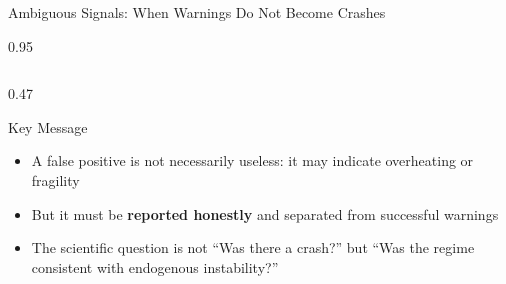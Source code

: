 \documentclass[9pt, aspectratio=169, t]{beamer}
\begin{document}
\begin{frame}{Ambiguous Signals: When Warnings Do Not Become Crashes}
\begin{cminipage}{0.95\textwidth}
{\begin{columns}[T]
\begin{column}{0.47\textwidth}
\begin{exampleblock}{Key Message}
                \begin{itemize}\setlength{\itemsep}{0pt}
                    \item A false positive is not necessarily useless: it may indicate overheating or fragility
                    \item But it must be \textbf{reported honestly} and separated from successful warnings
                    \item The scientific question is not ``Was there a crash?'' but ``Was the regime consistent with endogenous instability?''
                \end{itemize}
            \end{exampleblock}
        \end{column}
    \end{columns}
    }
    \end{cminipage}
\end{frame}
\end{document}
